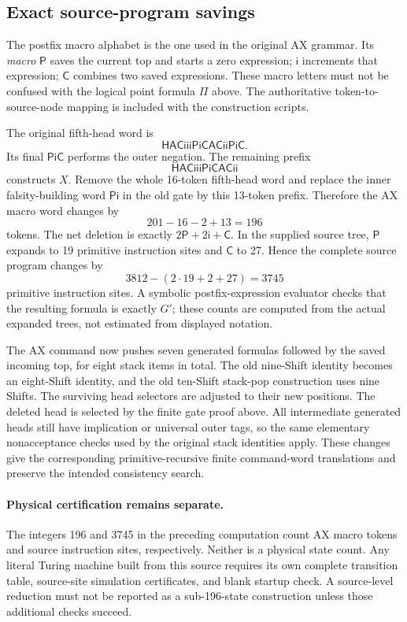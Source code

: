 \subsection{Exact source-program savings}

The postfix macro alphabet is the one used in the original AX grammar.  Its
\emph{macro} $\mathsf P$ saves the current top and starts a zero expression;
$\mathsf i$ increments that expression; $\mathsf C$ combines two saved
expressions.  These macro letters must not be confused with the logical point
formula $\Pi$ above.  The authoritative token-to-source-node mapping is
included with the construction scripts.

The original fifth-head word is
\[
 \mathsf{HACiiiPiCACiiPiC}.
\]
Its final $\mathsf{PiC}$ performs the outer negation.  The remaining prefix
\[
 \mathsf{HACiiiPiCACii}
\]
constructs $X$.  Remove the whole 16-token fifth-head word and replace the
inner falsity-building word $\mathsf{Pi}$ in the old gate by this 13-token
prefix.  Therefore the AX macro word changes by
\[
 201-16-2+13=196
\]
tokens.  The net deletion is exactly
$2\mathsf P+2\mathsf i+\mathsf C$.  In the supplied source tree,
$\mathsf P$ expands to 19 primitive instruction sites and
$\mathsf C$ to 27.  Hence the complete source program changes by
\[
 3812-(2\cdot19+2+27)=3745
\]
primitive instruction sites.  A symbolic postfix-expression evaluator checks
that the resulting formula is exactly $G'$; these counts are computed from
the actual expanded trees, not estimated from displayed notation.

The AX command now pushes seven generated formulas followed by the saved
incoming top, for eight stack items in total.  The old nine-Shift identity
becomes an eight-Shift identity, and the old ten-Shift stack-pop construction
uses nine Shifts.  The surviving head selectors are adjusted to their new
positions.  The deleted head is selected by the finite gate proof above.
All intermediate generated heads still have implication or universal outer
tags, so the same elementary nonacceptance checks used by the original stack
identities apply.  These changes give the corresponding primitive-recursive
finite command-word translations and preserve the intended consistency
search.

\paragraph{Physical certification remains separate.}
The integers 196 and 3745 in the preceding computation count AX macro tokens
and source instruction sites, respectively.  Neither is a physical state
count.  Any literal Turing machine built from this source requires its own
complete transition table, source-site simulation certificates, and blank
startup check.  A source-level reduction must not be reported as a
sub-196-state construction unless those additional checks succeed.


